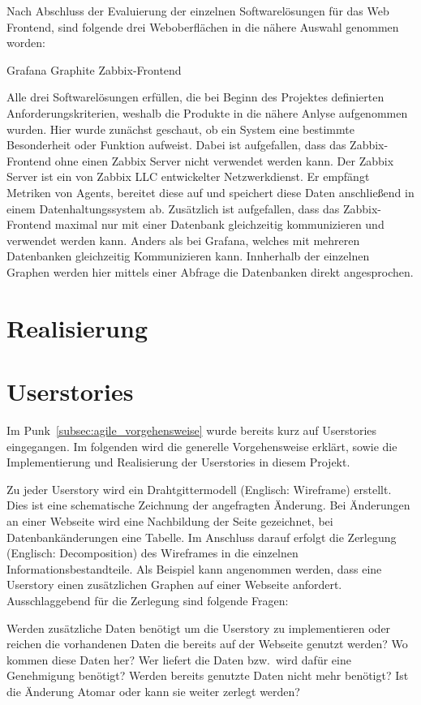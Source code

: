 Nach Abschluss der Evaluierung der einzelnen Softwarelösungen für das Web
Frontend, sind folgende drei Weboberflächen in die nähere Auswahl genommen
worden:

\begin{outline}
  \1 Grafana
  \1 Graphite
  \2 Zabbix-Frontend
\end{outline}

Alle drei Softwarelösungen erfüllen, die bei Beginn des Projektes definierten
Anforderungskriterien, weshalb die Produkte in die nähere Anlyse aufgenommen
wurden. Hier wurde zunächst geschaut, ob ein System eine bestimmte Besonderheit
oder Funktion aufweist. Dabei ist aufgefallen, dass das Zabbix-Frontend ohne
einen Zabbix Server nicht verwendet werden kann. Der Zabbix Server ist ein von
Zabbix LLC entwickelter Netzwerkdienst. Er empfängt Metriken von Agents,
bereitet diese auf und speichert diese Daten anschließend in einem
Datenhaltungssystem ab. Zusätzlich ist aufgefallen, dass das Zabbix-Frontend
maximal nur mit einer Datenbank gleichzeitig kommunizieren und verwendet werden
kann. Anders als bei Grafana, welches mit mehreren Datenbanken gleichzeitig
Kommunizieren kann. Innherhalb der einzelnen Graphen werden hier mittels einer
Abfrage die Datenbanken direkt angesprochen.
\mr%

\section{Realisierung}

\section{Userstories}
Im Punk~\ref{subsec:agile_vorgehensweise} wurde bereits kurz auf Userstories
eingegangen. Im folgenden wird die generelle Vorgehensweise erklärt, sowie die
Implementierung und Realisierung der Userstories in diesem Projekt.

Zu jeder Userstory wird ein Drahtgittermodell (Englisch: Wireframe) erstellt.
Dies ist eine schematische Zeichnung der angefragten Änderung. Bei Änderungen
an einer Webseite wird eine Nachbildung der Seite gezeichnet, bei
Datenbankänderungen eine Tabelle. Im Anschluss darauf erfolgt die Zerlegung
(Englisch: Decomposition) des Wireframes in die einzelnen
Informationsbestandteile. Als Beispiel kann angenommen werden, dass eine
Userstory einen zusätzlichen Graphen auf einer Webseite anfordert.
Ausschlaggebend für die Zerlegung sind folgende Fragen:

\begin{outline}
  \1 Werden zusätzliche Daten benötigt um die Userstory zu implementieren oder
  reichen die vorhandenen Daten die bereits auf der Webseite genutzt werden?
  \1 Wo kommen diese Daten her?
  \1 Wer liefert die Daten bzw.\ wird dafür eine Genehmigung benötigt?
  \1 Werden bereits genutzte Daten nicht mehr benötigt?
  \1 Ist die Änderung Atomar oder kann sie weiter zerlegt werden?
\end{outline}

